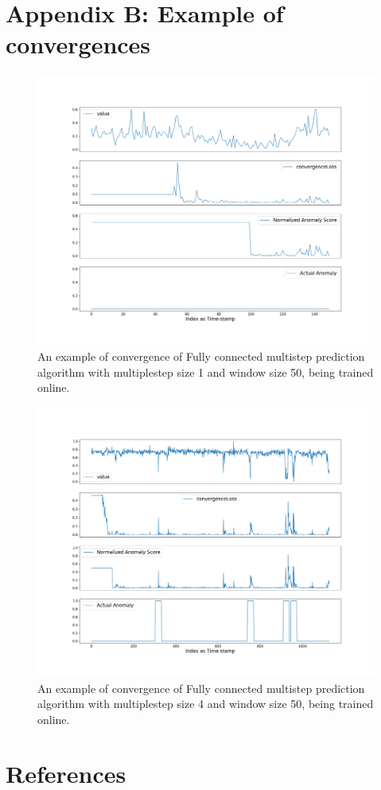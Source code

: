 \documentclass[12pt]{article}
\begin{document}
\section{Appendix B: Example of convergences}
\label{appendixB}
\begin{figure}[H]
\center
        \includegraphics[width=\textwidth]{images/results/predictionMultiStepNNMultiStep1Window50mseconvergenceLoss1271944.png}
    \caption{An example of convergence of Fully connected multistep prediction algorithm with multiplestep size 1 and window size 50, being trained online.}
    \label{fullyConnectedConvergenceProof}
\end{figure}
\begin{figure}[H]
\center
        \includegraphics[width=\textwidth]{images/results/predictionMultiStepNNMultiStep4Window50mseconvergenceLoss1271913.png}
    \caption{An example of convergence of Fully connected multistep prediction algorithm with multiplestep size 4 and window size 50, being trained online.}
    \label{fullyConnectedConvergenceProof}
\end{figure}
\newpage
\section{References}
\begingroup
\nocite{*}
\renewcommand{\section}[2]{}



\endgroup
\end{document}
